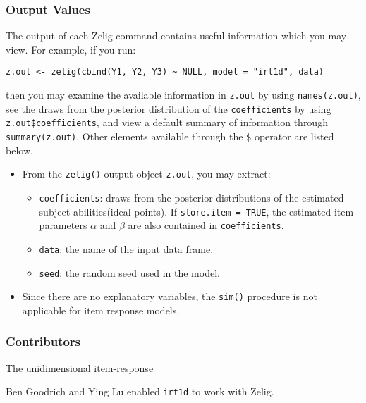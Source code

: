 \subsubsection{Output Values}

The output of each Zelig command contains useful information which you may
view. For example, if you run:
\begin{verbatim}
z.out <- zelig(cbind(Y1, Y2, Y3) ~ NULL, model = "irt1d", data)
\end{verbatim}
\noindent then you may examine the available information in \texttt{z.out} by
using \texttt{names(z.out)}, see the draws from the posterior distribution of
the \texttt{coefficients} by using \texttt{z.out\$coefficients}, and view 
a default summary of information through \texttt{summary(z.out)}. 
Other elements available through the \texttt{\$} operator are listed below.

\begin{itemize}

\item From the \texttt{zelig()} output object \texttt{z.out}, you may extract:

\begin{itemize}
\item \texttt{coefficients}: draws from the posterior distributions
of the estimated subject abilities(ideal points). If
\texttt{store.item = TRUE}, the estimated item parameters $\alpha$ and
$\beta$ are also contained in \texttt{coefficients}.

\item \texttt{data}: the name of the input data frame.
\item \texttt{seed}: the random seed used in the model.   

\end{itemize}

\item Since there are no explanatory variables, the \texttt{sim()}
procedure is not applicable for item response models.

\end{itemize}

\subsubsection{Contributors}
The unidimensional item-response 

\noindent Ben Goodrich and Ying Lu enabled \texttt{irt1d} to work with Zelig.


